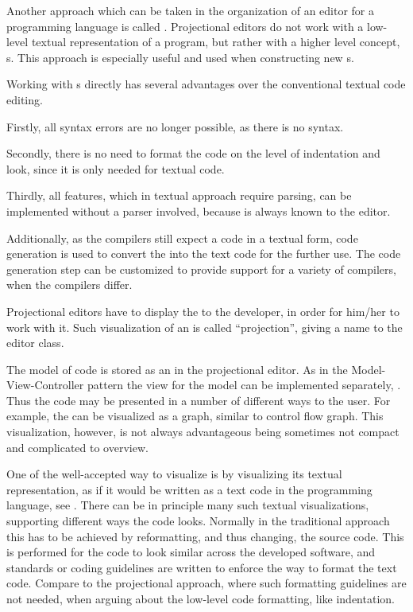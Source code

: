 Another approach which can be taken in the organization of an editor for a programming language is called . 
Projectional editors do not work with a low-level textual representation of a program, but rather with a higher level concept, s.
This approach is especially useful and used when constructing new s.

Working with s directly has several advantages over the conventional textual code editing.

Firstly, all syntax errors are no longer possible, as there is no syntax. 

Secondly, there is no need to format the code on the level of indentation and look, since it is only
needed for textual code.

Thirdly, all features, which in textual approach require parsing, can be implemented without a parser involved, because  is always known to the editor.

Additionally, as the compilers still expect a code in a textual form, code generation is used to
convert the  into the text code for the further use. The code generation step can be 
customized to provide support for a variety of compilers, when the compilers differ.

Projectional editors have to display the  to the developer, in order for him/her to work with it. Such visualization
of an  is called ``projection'', giving a name to the editor class.

The model of code is stored as an  in the projectional editor. As in the Model-View-Controller pattern the view for
the model can be implemented separately, \cite{GOF95}. Thus the code may be presented in a number of different ways to the user. For example, the  can be visualized as a graph, similar to control flow graph. This visualization, however, is not always advantageous being sometimes not compact and
complicated to overview.


One of the well-accepted way to visualize  is by visualizing its textual representation, as if
it would be written as a text code in the programming language, see . There can be in  
principle many such textual visualizations, supporting different ways the code looks. Normally in 
the traditional approach this has to be achieved by reformatting, and thus changing, the source code.
This is performed for the code to look similar across the developed software, and standards or coding 
guidelines are written to enforce the way to format the text code. Compare to the projectional approach,
where such formatting guidelines are not needed, when arguing about the low-level code formatting,
like indentation.

